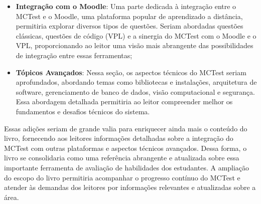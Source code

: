 \begin{itemize}
    \item \textbf{Integração com o Moodle}: Uma parte dedicada à integração entre o MCTest e o Moodle, uma plataforma popular de aprendizado a distância, permitiria explorar diversos tipos de questões. Seriam abordadas questões clássicas, questões de código (VPL) e a sinergia do MCTest com o Moodle e o VPL, proporcionando ao leitor uma visão mais abrangente das possibilidades de integração entre essas ferramentas;

    \item \textbf{Tópicos Avançados}: Nessa seção, os aspectos técnicos do MCTest seriam aprofundados, abordando temas como bibliotecas e instalações, arquitetura de software, gerenciamento de banco de dados, visão computacional e segurança. Essa abordagem detalhada permitiria ao leitor compreender melhor os fundamentos e desafios técnicos do sistema.
\end{itemize}

Essas adições seriam de grande valia para enriquecer ainda mais o conteúdo do livro, fornecendo aos leitores informações detalhadas sobre a integração do MCTest com outras plataformas e aspectos técnicos avançados. Dessa forma, o livro se consolidaria como uma referência abrangente e atualizada sobre essa importante ferramenta de avaliação de habilidades dos estudantes. A ampliação do escopo do livro permitiria acompanhar o progresso contínuo do MCTest e atender às demandas dos leitores por informações relevantes e atualizadas sobre a área.\\

